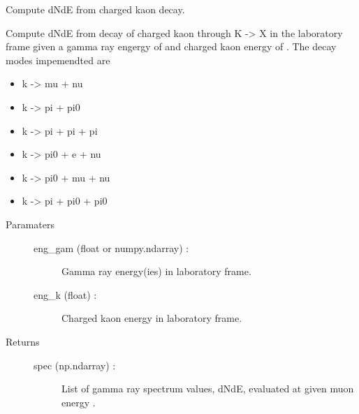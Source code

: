 \documentclass[letterpaper,10pt,english]{sphinxmanual}
\begin{document}
\begin{fulllineitems}
Compute dNdE from charged kaon decay.

Compute dNdE from decay of charged kaon through K -\textgreater{} X in the laboratory
frame given a gamma ray engergy of  and charged kaon energy of
. The decay modes impemendted are
\begin{itemize}
\item {} 
k -\textgreater{} mu  + nu

\item {} 
k -\textgreater{} pi  + pi0

\item {} 
k -\textgreater{} pi  + pi  + pi

\item {} 
k -\textgreater{} pi0 + e   + nu

\item {} 
k -\textgreater{} pi0 + mu  + nu

\item {} 
k -\textgreater{} pi  + pi0 + pi0

\end{itemize}
\begin{description}
\item[{Paramaters}] \leavevmode\begin{description}
\item[{eng\_gam (float or numpy.ndarray) :}] \leavevmode
Gamma ray energy(ies) in laboratory frame.

\item[{eng\_k (float) :}] \leavevmode
Charged kaon energy in laboratory frame.

\end{description}

\item[{Returns}] \leavevmode\begin{description}
\item[{spec (np.ndarray) :}] \leavevmode
List of gamma ray spectrum values, dNdE, evaluated at 
given muon energy .

\end{description}

\end{description}

\end{fulllineitems}
\end{document}
